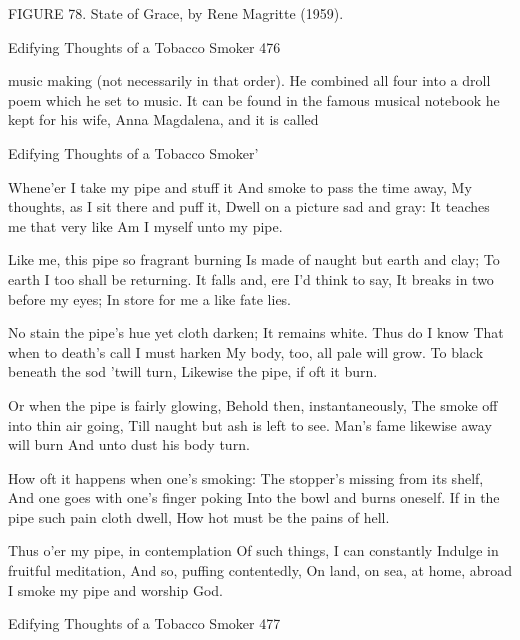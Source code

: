{                  FIGURE 78. State of Grace, by Rene Magritte (1959).




Edifying Thoughts of a Tobacco Smoker                                                    476

music making (not necessarily in that order). He combined all four into a droll poem
which he set to music. It can be found in the famous musical notebook he kept for his
wife, Anna Magdalena, and it is called

                       Edifying Thoughts of a Tobacco Smoker'

            Whene'er I take my pipe and stuff it
            And smoke to pass the time away,
            My thoughts, as I sit there and puff it,
            Dwell on a picture sad and gray:
            It teaches me that very like
            Am I myself unto my pipe.

            Like me, this pipe so fragrant burning
            Is made of naught but earth and clay;
            To earth I too shall be returning.
            It falls and, ere I'd think to say,
            It breaks in two before my eyes;
            In store for me a like fate lies.

            No stain the pipe's hue yet cloth darken;
            It remains white. Thus do I know
            That when to death's call I must harken
            My body, too, all pale will grow.
            To black beneath the sod 'twill turn,
            Likewise the pipe, if oft it burn.

            Or when the pipe is fairly glowing,
            Behold then, instantaneously,
            The smoke off into thin air going,
            Till naught but ash is left to see.
            Man's fame likewise away will burn
            And unto dust his body turn.

            How oft it happens when one's smoking:
            The stopper's missing from its shelf,
            And one goes with one's finger poking
            Into the bowl and burns oneself.
            If in the pipe such pain cloth dwell,
            How hot must be the pains of hell.

            Thus o'er my pipe, in contemplation
            Of such things, I can constantly
            Indulge in fruitful meditation,
            And so, puffing contentedly,
            On land, on sea, at home, abroad
            I smoke my pipe and worship God.

Edifying Thoughts of a Tobacco Smoker                                            477

}
